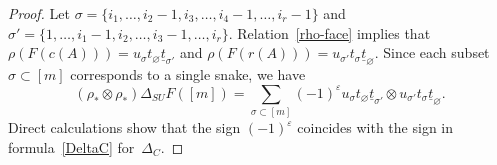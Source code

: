 \documentclass[10pt,a4paper]{amsart}
\begin{document}
\begin{proof}
Let $\sigma = \{i_1, \ldots, i_2 - 1, i_3, \ldots, i_4 - 1, \ldots, i_{r} - 1\}$ and $\sigma' = \{1, \ldots, i_1-1, i_2, \ldots, i_3-1, \ldots, i_{r} \}$. Relation~\eqref{rho-face} implies that $\rho(F(c(A))) = u_{\sigma} t_\varnothing \underline{t}_{\sigma'}$ and
$\rho(F(r(A))) = u_{\sigma'} t_{\sigma} \underline{t}_\varnothing$.
Since each subset $\sigma \subset [m]$ corresponds to a single snake, we have
\[
  (\rho_* \otimes \rho_*)\Delta_{SU}F([m]) = \sum_{\sigma \subset [m]} 
  (-1)^\varepsilon u_\sigma t_\varnothing \underline{t}_{\sigma'} \otimes 
  u_{\sigma'}t_{\sigma} \underline{t}_\varnothing.
\]
Direct calculations show that the sign $(-1)^\varepsilon$ coincides with the sign in formula~\eqref{DeltaC} for~$\Delta_{C}$.
\end{proof}
\end{document}

